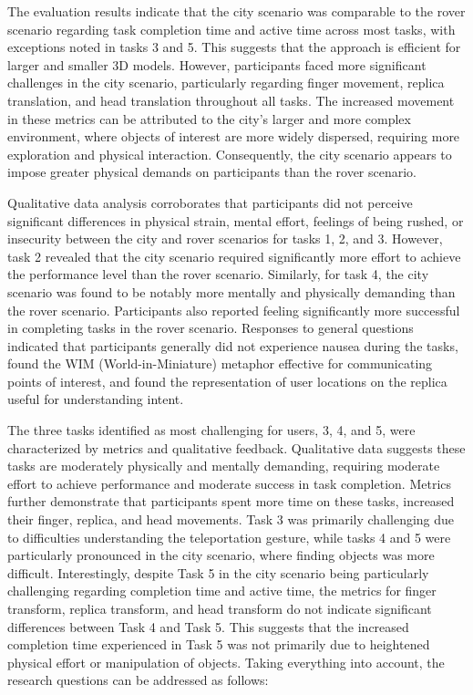         The evaluation results indicate that the city scenario was comparable to the rover scenario regarding task completion time and active time across most tasks, with exceptions noted in tasks 3 and 5. This suggests that the approach is efficient for larger and smaller 3D models. However, participants faced more significant challenges in the city scenario, particularly regarding finger movement, replica translation, and head translation throughout all tasks. The increased movement in these metrics can be attributed to the city's larger and more complex environment, where objects of interest are more widely dispersed, requiring more exploration and physical interaction. Consequently, the city scenario appears to impose greater physical demands on participants than the rover scenario.

        Qualitative data analysis corroborates that participants did not perceive significant differences in physical strain, mental effort, feelings of being rushed, or insecurity between the city and rover scenarios for tasks 1, 2, and 3. However, task 2 revealed that the city scenario required significantly more effort to achieve the performance level than the rover scenario. Similarly, for task 4, the city scenario was found to be notably more mentally and physically demanding than the rover scenario. Participants also reported feeling significantly more successful in completing tasks in the rover scenario. Responses to general questions indicated that participants generally did not experience nausea during the tasks, found the WIM (World-in-Miniature) metaphor effective for communicating points of interest, and found the representation of user locations on the replica useful for understanding intent.

        The three tasks identified as most challenging for users, 3, 4, and 5, were characterized by metrics and qualitative feedback. Qualitative data suggests these tasks are moderately physically and mentally demanding, requiring moderate effort to achieve performance and moderate success in task completion. Metrics further demonstrate that participants spent more time on these tasks, increased their finger, replica, and head movements. Task 3 was primarily challenging due to difficulties understanding the teleportation gesture, while tasks 4 and 5 were particularly pronounced in the city scenario, where finding objects was more difficult. Interestingly, despite Task 5 in the city scenario being particularly challenging regarding completion time and active time, the metrics for finger transform, replica transform, and head transform do not indicate significant differences between Task 4 and Task 5. This suggests that the increased completion time experienced in Task 5 was not primarily due to heightened physical effort or manipulation of objects. Taking everything into account, the research questions can be addressed as follows:

